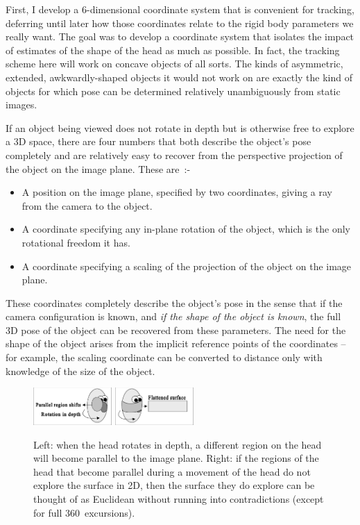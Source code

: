 First, I develop a 6-dimensional coordinate system that is convenient
for tracking, deferring until later how those coordinates relate to
the rigid body parameters we really want.  The goal was to develop a
coordinate system that isolates the impact of estimates of the shape
of the head as much as possible.  In fact, the tracking scheme here
will work on concave objects of all sorts.   The
kinds of asymmetric, extended, awkwardly-shaped objects it would not
work on are exactly the kind of objects for which pose can be
determined relatively unambiguously from static images.

If an object being viewed does not rotate in depth but is otherwise
free to explore a 3D space, there are four numbers that both describe
the object's pose completely and are relatively easy to recover from
the perspective projection of the object on the image plane.  These
are~:-

\begin{itemize}

\item A position on the image plane, specified by two coordinates,
giving a ray from the camera to the object.

\item A coordinate specifying any in-plane rotation of the object,
which is the only rotational freedom it has.

\item A coordinate specifying a scaling of the projection of the
object on the image plane.

\end{itemize}

These coordinates completely describe the object's pose in the sense
that if the camera configuration is known, and {\em if the shape of
the object is known}, the full 3D pose of the object can be recovered
from these parameters.  The need for the shape of the object arises
from the implicit reference points of the coordinates -- for example,
the scaling coordinate can be converted to distance only with
knowledge of the size of the object.

\begin{figure}[tbp]
\centerline{
\includegraphics[width=3cm]{parallel-shift.eps}
\includegraphics[width=3cm]{parallel-flat.eps}
}
\caption{ 
%
Left: when the head rotates in depth, a different region on the head
will become parallel to the image plane.  Right: if the regions of the
head that become parallel during a movement of the head do not explore
the surface in 2D, then the surface they do explore can be thought of
as Euclidean without running into contradictions (except for full
360\dgrs\ excursions).
%
}
\label{fig:parallel-shift}
\end{figure}

